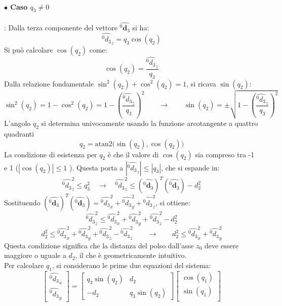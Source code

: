 ﻿\documentclass[11pt, a4paper]{article}
\begin{document}
\paragraph{\(\bullet\) Caso \(q_{3} \ne 0\)}: Dalla terza componente del vettore \(\hat{^{0}\mathbf{d}_{3}}\) si ha:
\[
    \hat{^{0}d_{3}}_{z} = q_{3} \cos(q_{2})
\]
Si può calcolare \( \cos(q_{2}) \) come:
\[
    \cos(q_{2}) = \frac{\hat{^{0}d_{3}}_{z}}{q_{3}}
\]
Dalla relazione fondamentale \(\sin^{2}(q_{2}) + \cos^{2}(q_{2}) = 1\), si ricava \(\sin(q_{2})\):
\[
    \sin^{2}(q_{2}) = 1 - \cos^{2}(q_{2}) = 1 - \left(\frac{\hat{^{0}d_{3}}_{z}}{q_{3}}\right)^2
    \qquad\longrightarrow\qquad
    \sin(q_{2})  = \pm\sqrt{1 - \left(\frac{\hat{^{0}d_{3}}_{z}}{q_{3}}\right)^2}
\]
L'angolo \(q_2\) si determina univocamente usando la funzione arcotangente a quattro quadranti
\[
    \boxed{q_{2} = \text{atan2} \biggl( \sin(q_{2}), \cos(q_{2}) \biggr)}
\]
La condizione di esistenza per $q_2$ è che il valore di $\cos(q_2)$ sia compreso tra -1 e 1 (\(|\cos(q_2) | \leq 1\) ). Questa porta a \(|\hat{^{0}d_{3}}_{z}| \leq |q_3|\), che si espande in:
\[
    \hat{^{0}d_{3}}_{z}^{2} \leq q_3^2 \quad \longrightarrow \quad \hat{^{0}d_{3}}_{z}^{2} \leq (\hat{^{0}\mathbf{d}_{3}})^{T} (\hat{^{0}\mathbf{d}_{3}}) - d_{2}^{2}
\]
Sostituendo \((\hat{^{0}\mathbf{d}_{3}})^{T} (\hat{^{0}\mathbf{d}_{3}}) = \hat{^{0}d_{3}}_{x}^2 + \hat{^{0}d_{3}}_{y}^2 + \hat{^{0}d_{3}}_{z}^2\), si ottiene:
\[
    \hat{^{0}d_{3}}_{z}^2 \leq \hat{^{0}d_{3}}_{x}^2 + \hat{^{0}d_{3}}_{y}^2 + \hat{^{0}d_{3}}_{z}^2 - d_{2}^{2}
\]
\[
    d_{2}^{2} \leq \hat{^{0}d_{3}}_{x}^2 + \hat{^{0}d_{3}}_{y}^2 + \hat{^{0}d_{3}}_{z}^2 - \hat{^{0}d_{3}}_{z}^2
    \qquad\longrightarrow\qquad
    d_2^2 \leq \hat{^{0}d_{3}}_{x}^2 + \hat{^{0}d_{3}}_{y}^2
\]
Questa condizione significa che la distanza del polso dall'asse \(z_0\) deve essere maggiore o uguale a \(d_2\), il che è geometricamente intuitivo.\\
Per calcolare \(q_{1}\), si considerano le prime due equazioni del sistema:
\[
    \begin{bmatrix}
        \hat{^{0}d_{3}}_{x}\\
        \hat{^{0}d_{3}}_{y}
    \end{bmatrix}
    =
    \begin{bmatrix}
        q_{3}\sin(q_{2}) & d_{2}\\
        -d_{2} & q_{3}\sin(q_{2})
    \end{bmatrix}
    \begin{bmatrix}
        \cos(q_{1})\\
        \sin(q_{1})\\
    \end{bmatrix}
\]
\end{document}
